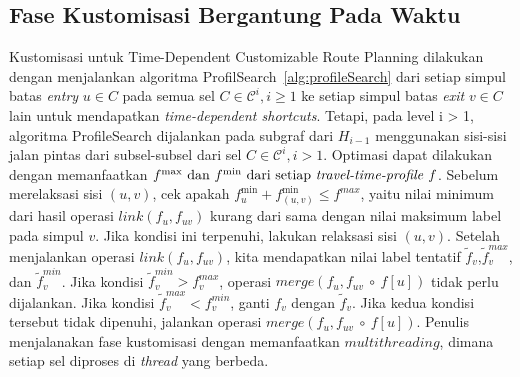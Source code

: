 \subsection{Fase Kustomisasi Bergantung Pada Waktu}
\label{subsec:tdcrp-timedependent-customization}
Kustomisasi untuk Time-Dependent Customizable Route Planning dilakukan dengan menjalankan algoritma ProfilSearch~\ref{alg:profileSearch} dari setiap simpul batas \textit{entry} $u\in C$ pada semua sel $C\in\mathcal{C}^{i}, i\geq 1$ ke setiap simpul batas \textit{exit} $v\in C$ lain untuk mendapatkan \textit{time-dependent shortcuts}.  Tetapi, pada level i > 1, algoritma ProfileSearch dijalankan pada subgraf dari $H_{i-1}$ menggunakan sisi-sisi jalan pintas dari subsel-subsel dari sel $C\in\mathcal{C}^i, i>1$. Optimasi dapat dilakukan dengan memanfaatkan $f^{\max}\text{ dan }f^{\min} \text{ dari setiap \textit{travel-time-profile} } f $. Sebelum merelaksasi sisi $(u,v)$, cek apakah $f_{u}^{\min}+f_{(u,v)}^{\min}\leq f^{max}$, yaitu nilai minimum dari hasil operasi $link(f_u,f_{uv})$ kurang dari sama dengan nilai maksimum label pada simpul $v$. Jika kondisi ini terpenuhi, lakukan relaksasi sisi $(u,v)$. Setelah menjalankan operasi $link(f_u,f_{uv})$, kita mendapatkan nilai label tentatif $\tilde{f}_v$,$\tilde{f}_v^{max}$, dan $\tilde{f}_v^{min}$. Jika kondisi $\tilde{f}_v^{min}>f_v^{max}$, operasi $merge(f_u,f_{uv}\ \circ \ f[u])$ tidak perlu dijalankan. Jika kondisi $\tilde{f}_v^{max}<f_v^{min}$, ganti $f_v$ dengan $\tilde{f}_v$. Jika kedua kondisi tersebut tidak dipenuhi, jalankan operasi $merge(f_u,f_{uv}\ \circ \ f[u])$. Penulis menjalanakan fase kustomisasi dengan memanfaatkan $multithreading$, dimana setiap sel diproses di \textit{thread} yang berbeda.


